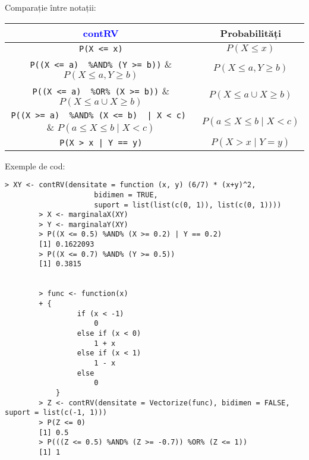\documentclass[12pt]{article}
\begin{document}
	Comparație între notații:
	\begin{center}
		\begin{tabular}{|| c | c ||}
			\hline
			\textcolor{blue}{contRV} & Probabilități \\
			
			\hline
			\lstinline|P(X <= x)| & $P(X \leq x)$ \\
			
			\hline
			\lstinline|P((X <= a)  %AND% (Y >= b))| & $P(X \leq a, Y \geq b)$ \\
			
			\hline
			\lstinline|P((X <= a)  %OR% (X >= b))| & $P(X \leq a \cup X \geq b)$ \\
			
			
			\hline
			\lstinline!P((X >= a)  %AND% (X <= b)  | X < c) ! & $P(a \leq X \leq b \mid X < c)$ \\
			
			\hline
			\lstinline!P(X > x | Y == y)! & $P(X > x \mid Y = y)$ \\
			
			\hline
			
		\end{tabular}
	\end{center}\vspace*{3\baselineskip}

	Exemple de cod:
	\begin{lstlisting}[numbers=none]
		> XY <- contRV(densitate = function (x, y) (6/7) * (x+y)^2,
		             bidimen = TRUE,
		             suport = list(list(c(0, 1)), list(c(0, 1))))
		> X <- marginalaX(XY)
		> Y <- marginalaY(XY)
		> P((X <= 0.5) %AND% (X >= 0.2) | Y == 0.2)
		[1] 0.1622093
		> P((X <= 0.7) %AND% (Y >= 0.5))
		[1] 0.3815
		
		
		> func <- function(x)
		+ {
			     if (x < -1)
			         0
			     else if (x < 0)
			         1 + x
			     else if (x < 1)
			         1 - x
			     else
			         0
			}
		> Z <- contRV(densitate = Vectorize(func), bidimen = FALSE, suport = list(c(-1, 1)))
		> P(Z <= 0)
		[1] 0.5
		> P(((Z <= 0.5) %AND% (Z >= -0.7)) %OR% (Z <= 1))
		[1] 1
	\end{lstlisting}
\end{document}
